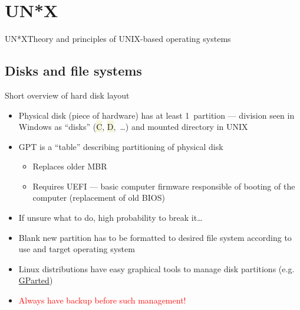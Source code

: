 \documentclass[compress, xelatex, 11pt, xcolor=svgnames, aspectratio=169, url={hyphens, lowtilde}]{beamer}
\renewcommand{\texttt}[1]{\colorbox{Beige}{{\ttfamily #1}}}
\renewcommand{\alert}[1]{\textcolor{red}{#1}}
\begin{document}
\section{UN*X}

\begin{frame}{UN*X}{Theory and principles of UNIX-based operating systems}
	\tableofcontents[currentsection, sectionstyle=show/hide, hideothersubsections]
\end{frame}

\subsection{Disks and file systems}

\begin{frame}{Short overview of hard disk layout}
	\begin{itemize}
		\item Physical disk (piece of hardware) has at least 1~partition --- division seen in Windows as \enquote{disks} (\texttt{C}, \texttt{D},~\ldots) and mounted directory in UNIX
		\item GPT is a \enquote{table} describing partitioning of physical disk
		\begin{itemize}
			\item Replaces older MBR
			\item Requires UEFI --- basic computer firmware responsible of booting of the computer (replacement of old BIOS)
		\end{itemize}
		\item If unsure what to do, high probability to break it\ldots
		\item Blank new partition has to be formatted to desired file system according to use and target operating system
		\item Linux distributions have easy graphical tools to manage disk partitions (e.g. \href{https://gparted.org/}{GParted})
		\item \alert{Always have backup before such management!}
	\end{itemize}
\end{frame}
\end{document}
